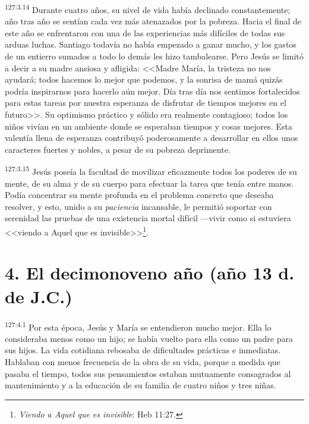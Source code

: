 \par 
\textsuperscript{127:3.14} Durante cuatro años, su nivel de vida había declinado constantemente; año tras año se sentían cada vez más atenazados por la pobreza. Hacia el final de este año se enfrentaron con una de las experiencias más difíciles de todas sus arduas luchas. Santiago todavía no había empezado a ganar mucho, y los gastos de un entierro sumados a todo lo demás les hizo tambalearse. Pero Jesús se limitó a decir a su madre ansiosa y afligida: <<Madre María, la tristeza no nos ayudará; todos hacemos lo mejor que podemos, y la sonrisa de mamá quizás podría inspirarnos para hacerlo aún mejor. Día tras día nos sentimos fortalecidos para estas tareas por nuestra esperanza de disfrutar de tiempos mejores en el futuro>>. Su optimismo práctico y sólido era realmente contagioso; todos los niños vivían en un ambiente donde se esperaban tiempos y cosas mejores. Esta valentía llena de esperanza contribuyó poderosamente a desarrollar en ellos unos caracteres fuertes y nobles, a pesar de su pobreza deprimente.

\par 
\textsuperscript{127:3.15} Jesús poseía la facultad de movilizar eficazmente todos los poderes de su mente, de su alma y de su cuerpo para efectuar la tarea que tenía entre manos. Podía concentrar su mente profunda en el problema concreto que deseaba resolver, y esto, unido a su \textit{paciencia} incansable, le permitió soportar con serenidad las pruebas de una existencia mortal difícil ---vivir como si estuviera <<viendo a Aquel que es invisible>>\footnote{\textit{Viendo a Aquel que es invisible}: Heb 11:27.}.

\section*{4. El decimonoveno año (año 13 d. de J.C.)}
\par 
\textsuperscript{127:4.1} Por esta época, Jesús y María se entendieron mucho mejor. Ella lo consideraba menos como un hijo; se había vuelto para ella como un padre para sus hijos. La vida cotidiana rebosaba de dificultades prácticas e inmediatas. Hablaban con menos frecuencia de la obra de su vida, porque a medida que pasaba el tiempo, todos sus pensamientos estaban mutuamente consagrados al mantenimiento y a la educación de su familia de cuatro niños y tres niñas.

